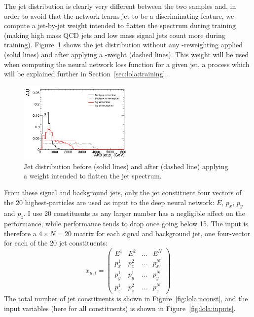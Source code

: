 The jet \PT distribution is clearly very different between the two samples and, in order to avoid that the network learns jet \PT to be a discriminating feature, we compute a jet-by-jet weight intended to flatten the \PT spectrum during training (making high mass QCD jets and low mass signal jets count more during training). Figure~\ref{fig:lola:ptweight} shows the jet \PT distribution without any \PT-reweighting applied (solid lines) and after applying a \PT-weight (dashed lines). This weight will be used when computing the neural network loss function for a given jet, a process which will be explained further in Section~\ref{sec:lola:training}.
\begin{figure}[h!]
\centering
\includegraphics[width=0.49\textwidth]{figures/vtagging/AN-18-099/input/pt_reweighted/postWeight.png}
\caption{Jet \PT distribution before (solid lines) and after (dashed line) applying a weight intended to flatten the jet \PT spectrum.}
\label{fig:lola:ptweight}
\end{figure}
From these signal and background jets, only the jet constituent four vectors of the 20 highest-\PT particles are used as input to the deep neural network: $E$, $p_x$, $p_y$ and $p_z$. I use 20 constituents as any larger number has a negligible affect on the performance, while performance tends to drop once going below 15. The input is therefore a $4 \times N=20$ matrix for each signal and background jet, one four-vector for each of the 20 jet constituents:
\begin{equation}
x_{\mu,i}=\begin{pmatrix}
E^1 & E^2 & \dots & E^N \\[1ex]
p_x^1 & p_x^2 & \dots & p_x^N \\[1ex]
p_y^1 & p_y^1 & \dots & p_y^N \\[1ex]
p_z^1 & p_z^2 & \dots & p_z^N
\end{pmatrix}
\end{equation}
The total number of jet constituents is shown in Figure~\ref{fig:lola:nconst}, and the input variables (here for all constituents) is shown in Figure~\ref{fig:lola:inputs}.\newline
